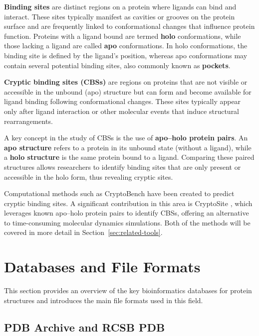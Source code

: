 \textbf{Binding sites} are distinct regions on a protein where ligands can bind and interact. These sites typically manifest as cavities or grooves on the protein surface and are frequently linked to conformational changes that influence protein function. Proteins with a ligand bound are termed \textbf{holo} conformations, while those lacking a ligand are called \textbf{apo} conformations. In holo conformations, the binding site is defined by the ligand’s position, whereas apo conformations may contain several potential binding sites, also commonly known as \textbf{pockets}.

\textbf{Cryptic binding sites (CBSs)} are regions on proteins that are not visible or accessible in the unbound (apo) structure but can form and become available for ligand binding following conformational changes. These sites typically appear only after ligand interaction or other molecular events that induce structural rearrangements.

A key concept in the study of CBSs is the use of \textbf{apo–holo protein pairs}. An \textbf{apo structure} refers to a protein in its unbound state (without a ligand), while a \textbf{holo structure} is the same protein bound to a ligand. Comparing these paired structures allows researchers to identify binding sites that are only present or accessible in the holo form, thus revealing cryptic sites.

Computational methods such as CryptoBench \cite{vskrhak2025cryptobench} have been created to predict cryptic binding sites. A significant contribution in this area is CryptoSite \cite{cimermancic2016cryptosite}, which leverages known apo–holo protein pairs to identify CBSs, offering an alternative to time-consuming molecular dynamics simulations. Both of the methods will be covered in more detail in Section~\ref{sec:related-tools}.

\section{Databases and File Formats}
\label{sec:dbs-formats}

This section provides an overview of the key bioinformatics databases for protein structures and introduces the main file formats used in this field.

\subsection{PDB Archive and RCSB PDB}
\label{sec:rcsb-pdb}

